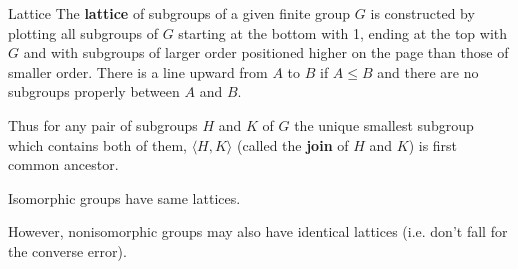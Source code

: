 \documentclass[titlepage, 12pt]{article}
\begin{document}
\begin{definition}{Lattice}{}
    The \textbf{lattice} of subgroups of a given finite group $G$ is constructed
    by plotting all subgroups of $G$ starting at the bottom with 1, ending at
    the top with $G$ and with subgroups of larger order positioned higher on the
    page than those of smaller order. There is a line upward from $A$ to $B$ if
    $A\le B$ and there are no subgroups properly between $A$ and $B$.
\end{definition}
Thus for any pair of subgroups $H$ and $K$ of $G$ the unique smallest subgroup
which contains both of them, $\langle H, K\rangle$ (called the \textbf{join} of
$H$ and $K$) is first common ancestor.
\begin{proposition}{}{}
    Isomorphic groups have same lattices.
\end{proposition}
However, nonisomorphic groups may also have identical lattices (i.e. don't fall
for the converse error).
\end{document}
